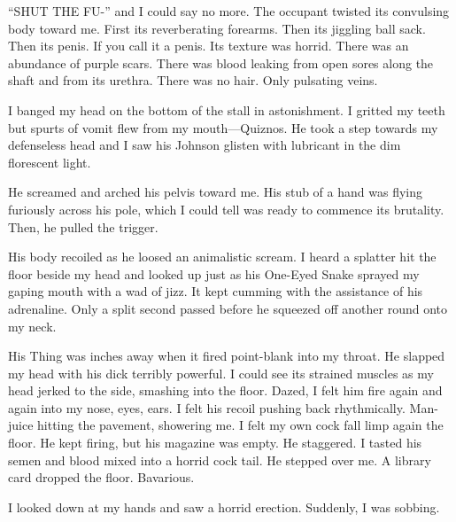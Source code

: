 ``SHUT THE FU-'' and I could say no more. The occupant
twisted its convulsing body toward me. First its reverberating
forearms. Then its jiggling ball sack. Then its penis. If you call
it a penis. Its texture was horrid. There was an abundance of
purple scars. There was blood leaking from open sores along the
shaft and from its urethra. There was no hair. Only pulsating
veins.



I banged my head on the bottom of the stall in astonishment. I
gritted my teeth but spurts of vomit flew from my
mouth---Quiznos. He took a step towards my defenseless head and
I saw his Johnson glisten with lubricant in the dim florescent
light.



He screamed and arched his pelvis toward me. His stub of a hand was
flying furiously across his pole, which I could tell was ready to
commence its brutality. Then, he pulled the trigger.



His body recoiled as he loosed an animalistic scream. I heard a
splatter hit the floor beside my head and looked up just as his
One-Eyed Snake sprayed my gaping mouth with a wad of jizz. It kept
cumming with the assistance of his adrenaline. Only a split second
passed before he squeezed off another round onto my neck.



His Thing was inches away when it fired point-blank into my throat.
He slapped my head with his dick terribly powerful. I could see its
strained muscles as my head jerked to the side, smashing into the
floor. Dazed, I felt him fire again and again into my nose, eyes,
ears. I felt his recoil pushing back rhythmically. Man-juice
hitting the pavement, showering me. I felt my own cock fall limp
again the floor. He kept firing, but his magazine was empty. He
staggered. I tasted his semen and blood mixed into a horrid cock
tail. He stepped over me. A library card dropped the floor.
Bavarious.



I looked down at my hands and saw a horrid erection. Suddenly, I
was sobbing. 
 



